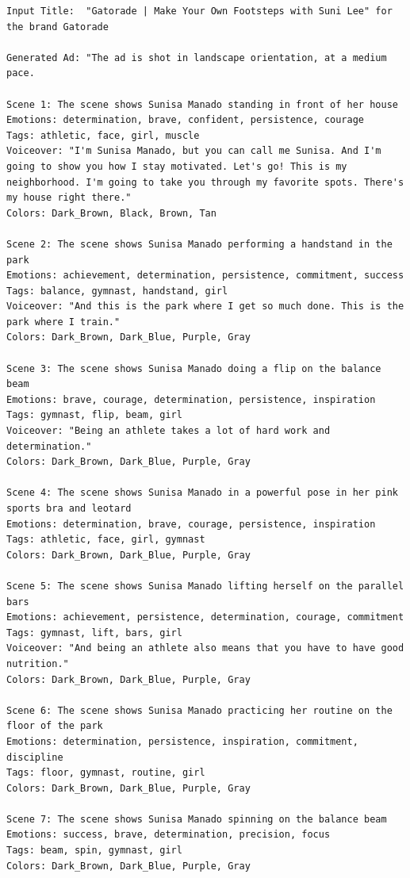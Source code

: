 \begin{lstlisting}[caption={Advertisement generated by Henry-SEED for an Gatorade ad. Original Ad: \url{https://www.youtube.com/watch?v=BKPQkjRF4yY}},frame=single,breaklines=true,basicstyle=\tiny, label={lst:gatorade}]
Input Title:  "Gatorade | Make Your Own Footsteps with Suni Lee" for the brand Gatorade

Generated Ad: "The ad is shot in landscape orientation, at a medium pace.

Scene 1: The scene shows Sunisa Manado standing in front of her house
Emotions: determination, brave, confident, persistence, courage
Tags: athletic, face, girl, muscle
Voiceover: "I'm Sunisa Manado, but you can call me Sunisa. And I'm going to show you how I stay motivated. Let's go! This is my neighborhood. I'm going to take you through my favorite spots. There's my house right there."
Colors: Dark_Brown, Black, Brown, Tan

Scene 2: The scene shows Sunisa Manado performing a handstand in the park
Emotions: achievement, determination, persistence, commitment, success
Tags: balance, gymnast, handstand, girl
Voiceover: "And this is the park where I get so much done. This is the park where I train."
Colors: Dark_Brown, Dark_Blue, Purple, Gray

Scene 3: The scene shows Sunisa Manado doing a flip on the balance beam
Emotions: brave, courage, determination, persistence, inspiration
Tags: gymnast, flip, beam, girl
Voiceover: "Being an athlete takes a lot of hard work and determination."
Colors: Dark_Brown, Dark_Blue, Purple, Gray

Scene 4: The scene shows Sunisa Manado in a powerful pose in her pink sports bra and leotard
Emotions: determination, brave, courage, persistence, inspiration
Tags: athletic, face, girl, gymnast
Colors: Dark_Brown, Dark_Blue, Purple, Gray

Scene 5: The scene shows Sunisa Manado lifting herself on the parallel bars
Emotions: achievement, persistence, determination, courage, commitment
Tags: gymnast, lift, bars, girl
Voiceover: "And being an athlete also means that you have to have good nutrition."
Colors: Dark_Brown, Dark_Blue, Purple, Gray

Scene 6: The scene shows Sunisa Manado practicing her routine on the floor of the park
Emotions: determination, persistence, inspiration, commitment, discipline
Tags: floor, gymnast, routine, girl
Colors: Dark_Brown, Dark_Blue, Purple, Gray

Scene 7: The scene shows Sunisa Manado spinning on the balance beam
Emotions: success, brave, determination, precision, focus
Tags: beam, spin, gymnast, girl
Colors: Dark_Brown, Dark_Blue, Purple, Gray


\end{lstlisting}
